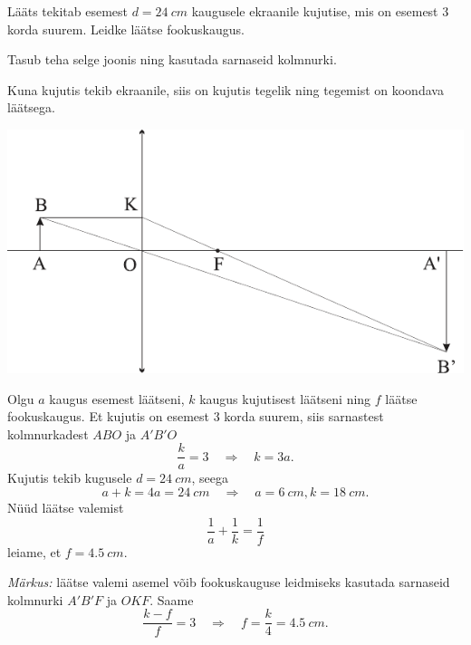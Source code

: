
Lääts tekitab esemest $d = \SI{24}{cm}$ kaugusele ekraanile kujutise, mis on esemest \num{3} korda suurem. Leidke läätse fookuskaugus.

\hint
Tasub teha selge joonis ning kasutada sarnaseid kolmnurki.

\solu
Kuna kujutis tekib ekraanile, siis on kujutis tegelik ning tegemist on koondava läätsega.

\begin{center}
	\includegraphics[width=0.9\linewidth]{2009-lahg-02-lah}
\end{center}

Olgu $a$ kaugus esemest läätseni, $k$ kaugus kujutisest läätseni ning $f$ läätse fookuskaugus. Et kujutis on esemest \num{3} korda suurem, siis sarnastest kolmnurkadest $ABO$ ja $A'B'O$
\[
\frac{k}{a}=3 \quad \Rightarrow \quad k=3 a.
\]
Kujutis tekib kugusele $d = \SI{24}{cm}$, seega
\[
a+k=4 a=\SI{24}{cm} \quad \Rightarrow \quad a=\SI{6}{cm}, k=\SI{18}{cm}.
\]
Nüüd läätse valemist
\[
\frac{1}{a}+\frac{1}{k}=\frac{1}{f}
\]
leiame, et $f = \SI{4,5}{cm}$.

\emph{Märkus:} läätse valemi asemel võib fookuskauguse leidmiseks kasutada sarnaseid kolmnurki $A'B'F$ ja $OKF$. Saame
\[
\frac{k-f}{f}=3 \quad \Rightarrow \quad f=\frac{k}{4}=\SI{4,5}{cm}.
\]
\probend